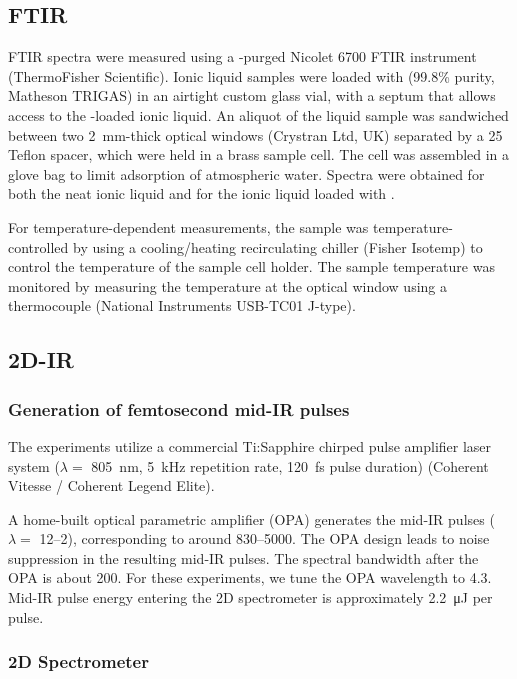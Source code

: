 {\subsection{FTIR}

FTIR spectra were measured using a -purged Nicolet 6700 FTIR instrument (ThermoFisher Scientific). Ionic liquid samples were loaded with  (99.8\% purity, Matheson TRIGAS) in an airtight custom glass vial, with a septum that allows access to the -loaded ionic liquid. An aliquot of the liquid sample was sandwiched between two 2~mm-thick  optical windows (Crystran Ltd, UK) separated by a \SI{25}{\micron} Teflon spacer, which were held in a brass sample cell. The cell was assembled in a glove bag to limit adsorption of atmospheric water. Spectra were obtained for both the neat ionic liquid and for the ionic liquid loaded with .

For temperature-dependent measurements, the sample was temperature-controlled by using a cooling/heating recirculating chiller (Fisher Isotemp) to control the temperature of the sample cell holder. The sample temperature was monitored by measuring the temperature at the optical window using a thermocouple (National Instruments USB-TC01 J-type).

\subsection{2D-IR}
\subsubsection{Generation of femtosecond mid-IR pulses}

The experiments utilize a commercial Ti:Sapphire chirped pulse amplifier laser system ($\lambda =$ \SI{805}{\nm}, \SI{5}{\kilo\hertz} repetition rate, \SI{120}{\fs} pulse duration) (Coherent Vitesse / Coherent Legend Elite).

A home-built optical parametric amplifier (OPA) generates the mid-IR pulses ($\lambda =$ \SIrange[range-units = single]{12}{2}{\micron}), corresponding to around \SIrange{830}{5000}{\wavenumber}. The OPA design leads to noise suppression in the resulting mid-IR pulses.\cite{Hamm2000} The spectral bandwidth after the OPA is about \SI{200}{\wavenumber}. For these experiments, we tune the OPA wavelength to \SI{4.3}{\micron}. Mid-IR pulse energy entering the 2D spectrometer is approximately \SI{2.2}{\micro\joule} per pulse.

\subsubsection{2D Spectrometer}

}
